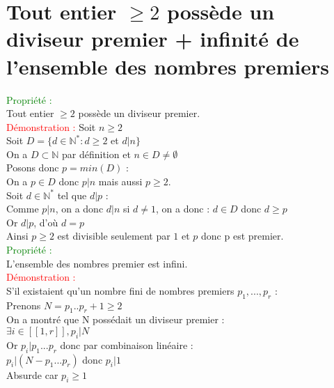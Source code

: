 \documentclass{article}
\begin{document}
\section{Tout entier $\geq 2$ possède un diviseur premier + infinité de l'ensemble des nombres premiers}
\textcolor{green}{Propriété :} \\ 
Tout entier $\geq 2$ possède un diviseur premier. \\ 
\textcolor{red}{Démonstration :} Soit $n \geq 2$ \\ 
Soit $D=\lbrace d \in \mathbb{N}^\ast : d \geq 2$ et $d|n \rbrace$ \\ 
On a $D \subset \mathbb{N}$ par définition et $n \in D \neq \emptyset$ \\ 
Posons donc $p=min(D)$ : \\ 
On a $p \in D$ donc $p|n$ mais aussi $p \geq 2$. \\ 
Soit $d \in \mathbb{N}^ \ast$ tel que $d|p$ : \\ 
Comme $p|n$, on a donc $d|n$ si $d \neq 1$, on a donc : $d \in D$ donc $d \geq p$ \\ 
Or $d|p$, d'où $d=p$ \\ 
Ainsi $p\geq 2$ est divisible seulement par $1$ et $p$ donc p est premier. \\
\textcolor{green}{Propriété :} \\ 
L'ensemble des nombres premier est infini. \\ 
\textcolor{red}{Démonstration :} \\ 
S'il existaient qu'un nombre fini de nombres premiers $p_1,...,p_r$ : \\ 
Prenons $N=p_1..p_r+1 \geq 2$ \\ 
On a montré que N possédait un diviseur premier : \\ 
$\exists i \in [[1,r]], p_i |N$ \\ 
Or $p_i|p_1...p_r$ donc par combinaison linéaire : \\ 
$p_i|(N-p_1...p_r)$ donc $p_i|1$ \\ 
Absurde car $p_i \geq 1$
\end{document}
